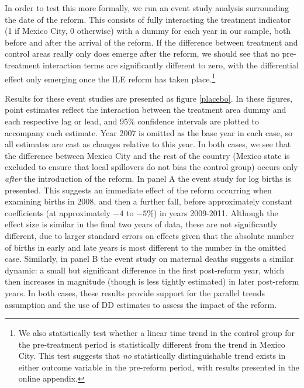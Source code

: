 \documentclass[a4paper, 11pt]{article}
\begin{document}
\begin{spacing}{2}
In order to test this more formally, we run an event study analysis surrounding the date of the reform.  This consists of fully interacting the treatment indicator (1 if Mexico City, 0 otherwise) with a dummy for each year in our sample, both before and after the arrival of the reform.  If the difference between treatment and control areas really only does emerge after the reform, we should see that no pre-treatment interaction terms are significantly different to zero, with the differential effect only emerging once the ILE reform has taken place.\footnote{We also statistically test whether a linear time trend in the control group for the pre-treatment period is statistically different from the trend in Mexico City. This test suggests that \emph{no} statistically distinguishable trend exists in either outcome variable in the pre-reform period, with results presented in the online appendix.}

Results for these event studies are presented as figure \ref{placebo}.  In these figures, point estimates reflect the interaction between the treatment area dummy and each respective lag or lead, and 95\% confidence intervals are plotted to accompany each estimate.  Year 2007 is omitted as the base year in each case, so all estimates are cast as changes relative to this year.  In both cases, we see that the difference between Mexico City and the rest of the country (Mexico state is excluded to ensure that local spillovers do not bias the control group) occurs only \emph{after} the introduction of the reform.  In panel A the event study for log births is presented.  This suggests an immediate effect of the reform occurring when examining births in 2008, and then a further fall, before approximately constant coefficients (at approximately $-4$ to $-5\%$) in years 2009-2011.  Although the effect size is similar in the final two years of data, these are not significantly different, due to larger standard errors on effects given that the absolute number of births in early and late years is most different to the number in the omitted case.  Similarly, in panel B the event study on maternal deaths suggests a similar dynamic: a small but significant difference in the first post-reform year, which then increases in magnitude (though is less tightly estimated) in later post-reform years.  In both cases, these results provide support for the parallel trends assumption and the use of DD estimates to assess the impact of the reform.


\end{spacing}
\end{document}
